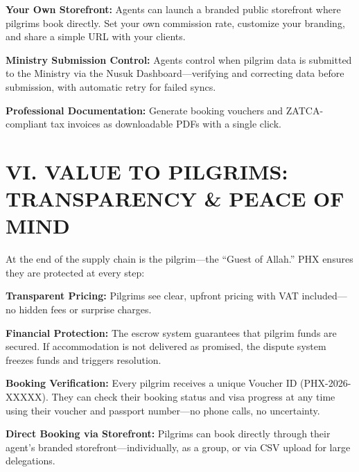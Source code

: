 \documentclass[11pt,a4paper]{article}
\begin{document}
\vspace{0.3cm}

\textbf{Your Own Storefront:} Agents can launch a branded public storefront where pilgrims book directly. Set your own commission rate, customize your branding, and share a simple URL with your clients.

\vspace{0.3cm}

\textbf{Ministry Submission Control:} Agents control when pilgrim data is submitted to the Ministry via the Nusuk Dashboard---verifying and correcting data before submission, with automatic retry for failed syncs.

\vspace{0.3cm}

\textbf{Professional Documentation:} Generate booking vouchers and ZATCA-compliant tax invoices as downloadable PDFs with a single click.

\section*{VI. VALUE TO PILGRIMS: TRANSPARENCY \& PEACE OF MIND}

At the end of the supply chain is the pilgrim---the ``Guest of Allah.'' PHX ensures they are protected at every step:

\vspace{0.3cm}

\textbf{Transparent Pricing:} Pilgrims see clear, upfront pricing with VAT included---no hidden fees or surprise charges.

\vspace{0.3cm}

\textbf{Financial Protection:} The escrow system guarantees that pilgrim funds are secured. If accommodation is not delivered as promised, the dispute system freezes funds and triggers resolution.

\vspace{0.3cm}

\textbf{Booking Verification:} Every pilgrim receives a unique Voucher ID (PHX-2026-XXXXX). They can check their booking status and visa progress at any time using their voucher and passport number---no phone calls, no uncertainty.

\vspace{0.3cm}

\textbf{Direct Booking via Storefront:} Pilgrims can book directly through their agent's branded storefront---individually, as a group, or via CSV upload for large delegations.
\end{document}
